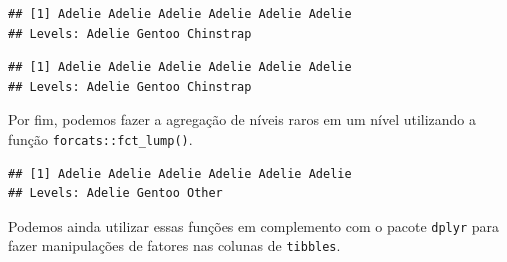 \documentclass[
]{article}
\newenvironment{Shaded}{\begin{snugshade}}{\end{snugshade}}
\newcommand{\DocumentationTok}[1]{\textcolor[rgb]{0.56,0.35,0.01}{\textbf{\textit{#1}}}}
\newcommand{\FunctionTok}[1]{\textcolor[rgb]{0.13,0.29,0.53}{\textbf{#1}}}
\newcommand{\NormalTok}[1]{#1}
\newcommand{\SpecialCharTok}[1]{\textcolor[rgb]{0.81,0.36,0.00}{\textbf{#1}}}
\begin{document}
\begin{Shaded}
\end{Shaded}

\begin{verbatim}
## [1] Adelie Adelie Adelie Adelie Adelie Adelie
## Levels: Adelie Gentoo Chinstrap
\end{verbatim}

\begin{Shaded}
\end{Shaded}

\begin{verbatim}
## [1] Adelie Adelie Adelie Adelie Adelie Adelie
## Levels: Adelie Gentoo Chinstrap
\end{verbatim}

Por fim, podemos fazer a agregação de níveis raros em um nível utilizando a função \texttt{forcats::fct\_lump()}.

\begin{Shaded}
\end{Shaded}

\begin{verbatim}
## [1] Adelie Adelie Adelie Adelie Adelie Adelie
## Levels: Adelie Gentoo Other
\end{verbatim}

Podemos ainda utilizar essas funções em complemento com o pacote \texttt{dplyr} para fazer manipulações de fatores nas colunas de \texttt{tibbles}.
\end{document}
